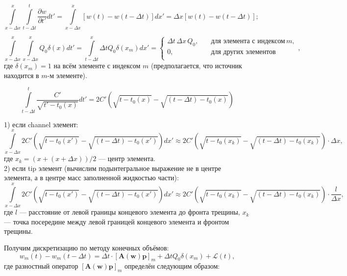 \documentclass[11pt,a4paper,russian,dvipsnames ]{article}
\begin{document}
\begin{equation}
	\int \limits_{x-\Delta x}^{x} \int \limits_{t-\Delta t}^{t} \frac{\partial w}{\partial t'} dt' =
	\int \limits_{x-\Delta x}^{x} [w(t) - w(t - \Delta t)] dx' = \Delta x [w(t) - w(t - \Delta t)];
\end{equation}

\begin{equation}
	\int \limits_{x-\Delta x}^{x} \int \limits_{x-\Delta x}^{x} Q_0 \delta(x) dt' = \int \limits_{t-\Delta t}^{x} \Delta t Q_0 \delta(x_m) dx' = \left\{
	\begin{array}{ll}
		\Delta t \, \Delta x \, Q_0, &\quad \text{для элемента с индексом} \, m,\\
		0, &\quad \text{для других элементов} \\		
	\end{array}
	\right.,
\end{equation}
где $\delta(x_m) = 1$ на всём элементе с индексом $m$ (предполагается, что источник находится в $m$-м элементе).

\begin{equation}
	\int \limits_{t-\Delta t}^{t} \frac{C'}{\sqrt{t'-t_{0}(x)}} dt' = 2C' \left( \sqrt{t - t_0(x)} - \sqrt{(t - \Delta t) - t_0(x)} \right)
\end{equation} 

1) если channel элемент:
\begin{equation}
	\int \limits_{x-\Delta x}^{x} 2C' \left( \sqrt{t - t_0(x')} - \sqrt{(t - \Delta t) - t_0(x')} \right) dx' \approx 
	2C' \left( \sqrt{t - t_0(x_k)} - \sqrt{(t - \Delta t) - t_0(x_k)} \right) \cdot \Delta x,
\end{equation}	
где $x_k = (x + (x + \Delta x))/2$ --- центр элемента. \\

2) если tip элемент (вычислим подынтегральное выражение не в центре элемента, а в центре масс заполненной жидкостью части):
\begin{equation}
	\int \limits_{x-\Delta x}^{x} 2C' \left( \sqrt{t - t_0(x')} - \sqrt{(t - \Delta t) - t_0(x')} \right) dx' \approx 
	2C' \left( \sqrt{t - t_0(x_k)} - \sqrt{(t - \Delta t) - t_0(x_k)} \right) \cdot \frac{l}{\Delta x},
\end{equation}	
где $l$ --- расстояние от левой границы концевого элемента до фронта трещины, $x_k$ --- точка посередине между левой границей концевого элемента и фронтом трещины.

Получим дискретизацию по методу конечных объёмов:
\begin{equation}
	w_m(t) - w_m(t - \Delta t) = \Delta t \cdot [\bm{A}(\bm{w}) \bm{p}]_m + \Delta t Q_0 \delta(x_m) + \mathcal{L}(t),
\end{equation}
где разностный оператор $[\bm{A}(\bm{w}) \bm{p}]_m$ определён следующим образом:
\end{document}
